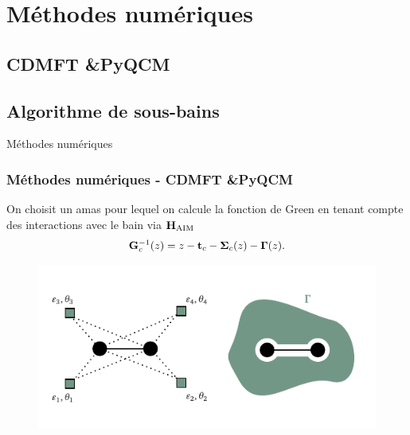 

\section{Méthodes numériques}

\subsection{CDMFT \&\;PyQCM}

\subsection{Algorithme de sous-bains}

\begin{frame}
    \vfill
    \begin{center}
        \large
        Méthodes numériques
    \end{center}
    \vfill
\end{frame}

\begin{frame}
  \frametitle{Méthodes numériques - CDMFT \&\;PyQCM}
    On choisit un amas pour lequel on calcule la fonction de Green en tenant
    compte des interactions avec le bain via $\vb{H}_{\text{AIM}}$
    \begin{align}
        \vb{G}_c^{-1}(z) = z - \vb{t}_c - \vb{\Sigma}_c(z) - \vb{\Gamma}(z).
    \end{align}
    \begin{figure}
         \centering
         \includegraphics[scale=0.8]{./figures/theory/1D_2s_4b_bulk.pdf}
         \label{fig: amas_CDMFT}
    \end{figure}
\end{frame}

